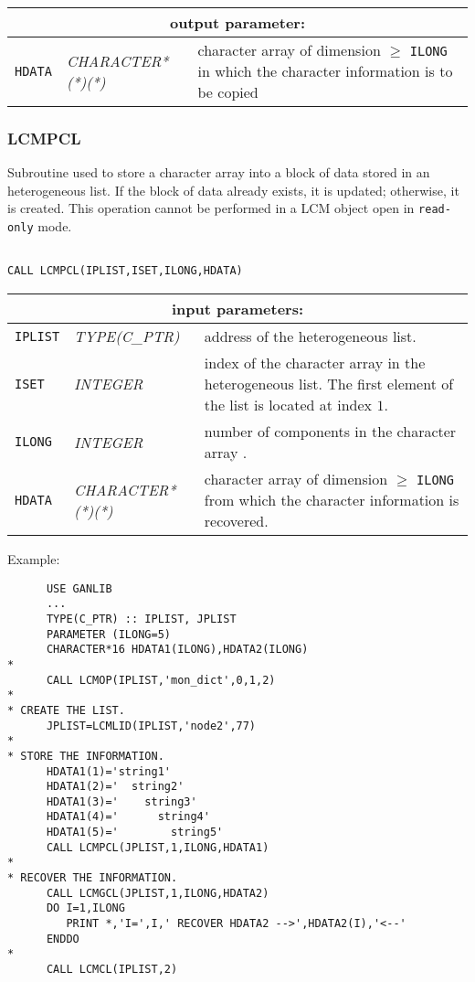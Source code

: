 \vskip 0.8cm

\noindent
\begin{tabular}{|p{1.5cm}|p{3.5cm}|p{9.5cm}|}
\hline
\multicolumn{3}{|c|}{\bf output parameter:} \\
\hline
{\tt HDATA} & {\it CHARACTER*(*)(*)} & character array of dimension $\ge$ {\tt ILONG} in which the character information is to be copied \\
\hline
\end{tabular}

\subsubsection{LCMPCL}\label{sect:LCMPCL}

Subroutine used to store a character array into a block of data stored in an heterogeneous list.
If the block of data already exists, it is updated; otherwise, it is created. This operation cannot be performed
in a LCM object open in {\tt read-only} mode.

\begin{verbatim}

CALL LCMPCL(IPLIST,ISET,ILONG,HDATA)
\end{verbatim}

\noindent
\begin{tabular}{|p{1.5cm}|p{3.5cm}|p{9.5cm}|}
\hline
\multicolumn{3}{|c|}{\bf input parameters:} \\
\hline
{\tt IPLIST} & {\it TYPE(C\_PTR)} & address of the heterogeneous list. \\
\hline
{\tt ISET} & {\it INTEGER} & index of the character array in the heterogeneous list.
The first element of the list is located at index  $1$. \\
\hline
{\tt ILONG} & {\it INTEGER} & number of components in the character array .\\
\hline
{\tt HDATA} & {\it CHARACTER*(*)(*)} & character array of dimension $\ge$ {\tt ILONG} from which the character information is recovered.  \\
\hline
\end{tabular}

\vskip 0.4cm

\noindent Example:
\begin{verbatim}
      USE GANLIB
      ...
      TYPE(C_PTR) :: IPLIST, JPLIST
      PARAMETER (ILONG=5)
      CHARACTER*16 HDATA1(ILONG),HDATA2(ILONG)
*
      CALL LCMOP(IPLIST,'mon_dict',0,1,2)
*
* CREATE THE LIST.
      JPLIST=LCMLID(IPLIST,'node2',77)
*
* STORE THE INFORMATION.
      HDATA1(1)='string1'
      HDATA1(2)='  string2'
      HDATA1(3)='    string3'
      HDATA1(4)='      string4'
      HDATA1(5)='        string5'
      CALL LCMPCL(JPLIST,1,ILONG,HDATA1)
*
* RECOVER THE INFORMATION.
      CALL LCMGCL(JPLIST,1,ILONG,HDATA2)
      DO I=1,ILONG
         PRINT *,'I=',I,' RECOVER HDATA2 -->',HDATA2(I),'<--'
      ENDDO
*
      CALL LCMCL(IPLIST,2)
\end{verbatim}

